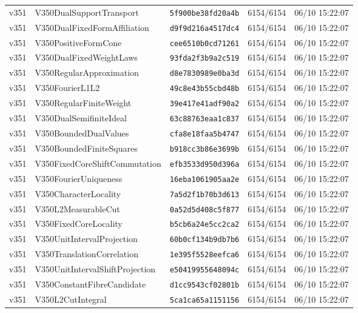 \documentclass[11pt]{article}
\theoremstyle{definition}\newtheorem{deriv}{Derivation}
\begin{document}
{\begin{longtable}{@{}lllll@{}}
v351 & V350DualSupportTransport & \texttt{5f900be38fd20a4b} & 6154/6154 & 06/10 15:22:07 \\
v351 & V350DualFixedFormAffiliation & \texttt{d9f9d216a4517dc4} & 6154/6154 & 06/10 15:22:07 \\
v351 & V350PositiveFormCone & \texttt{cee6510b0cd71261} & 6154/6154 & 06/10 15:22:07 \\
v351 & V350DualFixedWeightLaws & \texttt{93fda2f3b9a2c519} & 6154/6154 & 06/10 15:22:07 \\
v351 & V350RegularApproximation & \texttt{d8e7830989e0ba3d} & 6154/6154 & 06/10 15:22:07 \\
v351 & V350FourierL1L2 & \texttt{49c8e43b55cbd48b} & 6154/6154 & 06/10 15:22:07 \\
v351 & V350RegularFiniteWeight & \texttt{39e417e41adf90a2} & 6154/6154 & 06/10 15:22:07 \\
v351 & V350DualSemifiniteIdeal & \texttt{63c88763eaa1c837} & 6154/6154 & 06/10 15:22:07 \\
v351 & V350BoundedDualValues & \texttt{cfa8e18faa5b4747} & 6154/6154 & 06/10 15:22:07 \\
v351 & V350BoundedFiniteSquares & \texttt{b918cc3b86e3699b} & 6154/6154 & 06/10 15:22:07 \\
v351 & V350FixedCoreShiftCommutation & \texttt{efb3533d950d396a} & 6154/6154 & 06/10 15:22:07 \\
v351 & V350FourierUniqueness & \texttt{16eba1061905aa2e} & 6154/6154 & 06/10 15:22:07 \\
v351 & V350CharacterLocality & \texttt{7a5d2f1b70b3d613} & 6154/6154 & 06/10 15:22:07 \\
v351 & V350L2MeasurableCut & \texttt{0a52d5d408c5f877} & 6154/6154 & 06/10 15:22:07 \\
v351 & V350FixedCoreLocality & \texttt{b5cb6a24e5cc2ca2} & 6154/6154 & 06/10 15:22:07 \\
v351 & V350UnitIntervalProjection & \texttt{60b0cf134b9db7b6} & 6154/6154 & 06/10 15:22:07 \\
v351 & V350TranslationCorrelation & \texttt{1e395f5528eefca6} & 6154/6154 & 06/10 15:22:07 \\
v351 & V350UnitIntervalShiftProjection & \texttt{e50419955648094c} & 6154/6154 & 06/10 15:22:07 \\
v351 & V350ConstantFibreCandidate & \texttt{d1cc9543cf02801b} & 6154/6154 & 06/10 15:22:07 \\
v351 & V350L2CutIntegral & \texttt{5ca1ca65a1151156} & 6154/6154 & 06/10 15:22:07 \\

\end{longtable}}
\end{document}
